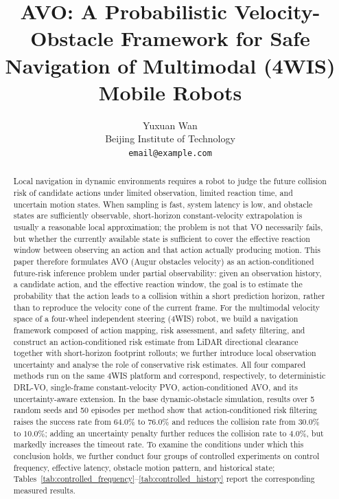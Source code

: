 \documentclass[10pt,a4paper,twocolumn]{article}
\title{\textbf{AVO: A Probabilistic Velocity-Obstacle Framework for Safe Navigation of Multimodal (4WIS) Mobile Robots}}
\author{Yuxuan Wan\\
Beijing Institute of Technology\\
\texttt{email@example.com}}
\date{}
\begin{document}
\maketitle

\begin{abstract}
Local navigation in dynamic environments requires a robot to judge the future collision risk of candidate actions under limited observation, limited reaction time, and uncertain motion states. When sampling is fast, system latency is low, and obstacle states are sufficiently observable, short-horizon constant-velocity extrapolation is usually a reasonable local approximation; the problem is not that VO necessarily fails, but whether the currently available state is sufficient to cover the effective reaction window between observing an action and that action actually producing motion. This paper therefore formulates AVO (Augur obstacles velocity) as an action-conditioned future-risk inference problem under partial observability: given an observation history, a candidate action, and the effective reaction window, the goal is to estimate the probability that the action leads to a collision within a short prediction horizon, rather than to reproduce the velocity cone of the current frame. For the multimodal velocity space of a four-wheel independent steering (4WIS) robot, we build a navigation framework composed of action mapping, risk assessment, and safety filtering, and construct an action-conditioned risk estimate from LiDAR directional clearance together with short-horizon footprint rollouts; we further introduce local observation uncertainty and analyse the role of conservative risk estimates. All four compared methods run on the same 4WIS platform and correspond, respectively, to deterministic DRL-VO, single-frame constant-velocity PVO, action-conditioned AVO, and its uncertainty-aware extension. In the base dynamic-obstacle simulation, results over 5 random seeds and 50 episodes per method show that action-conditioned risk filtering raises the success rate from $64.0\%$ to $76.0\%$ and reduces the collision rate from $30.0\%$ to $10.0\%$; adding an uncertainty penalty further reduces the collision rate to $4.0\%$, but markedly increases the timeout rate. To examine the conditions under which this conclusion holds, we further conduct four groups of controlled experiments on control frequency, effective latency, obstacle motion pattern, and historical state; Tables~\ref{tab:controlled_frequency}--\ref{tab:controlled_history} report the corresponding measured results.
\end{abstract}
\end{document}
